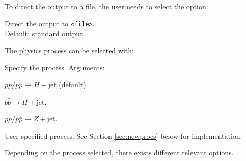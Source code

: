 \documentclass[12pt]{article}
\begin{document}
\noindent
To direct the output to a file, the user needs to select the option: 
\begin{description}[labelindent=1cm, labelwidth =\widthof{\bfseries9999999999999999999999}, leftmargin = !] 
	\item[\texttt{-o, --out <file>}] Direct the output to \texttt{<file>}.\\ Default: standard output.
\end{description}
The physics process can be selected with: 
\begin{description}[labelindent=1cm, labelwidth =\widthof{\bfseries9999999999999999999999}, leftmargin = !] 
	\item[\texttt{--proc <arg>}] Specify the process. Arguments: \vspace{-2mm} 
	\begin{description}[labelwidth =\widthof{\bfseries99999}, leftmargin = !] 
		\item[\texttt{H}] $pp/p\bar{p} \rightarrow H + \text{jet}$ (default). 
		\item[\texttt{bbH}] $b\bar{b} \rightarrow H + \text{jet}$. 
		\item[\texttt{Z}] $pp/p\bar{p} \rightarrow Z + \text{jet}$. 
		\item[\texttt{user}] User specified process. See Section \ref{sec:newprocs} below for implementation. 
	\end{description}
\end{description}
Depending on the process selected, there exists different relevant options. 
\end{document}
